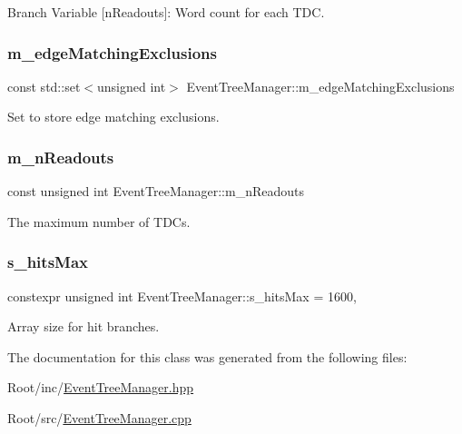 Branch Variable \mbox{[}n\+Readouts\mbox{]}\+: Word count for each T\+DC. 

\mbox{\label{class_event_tree_manager_aea70f1feef081fb124517ba8efc4087b}} 
\subsubsection{\texorpdfstring{m\+\_\+edge\+Matching\+Exclusions}{m\_edgeMatchingExclusions}}
{\footnotesize\ttfamily const std\+::set$<$unsigned int$>$ Event\+Tree\+Manager\+::m\+\_\+edge\+Matching\+Exclusions\hspace{0.3cm}{\ttfamily [private]}}



Set to store edge matching exclusions. 

\mbox{\label{class_event_tree_manager_ac0fce7275ef1c587302ff67e53ad5a77}} 
\subsubsection{\texorpdfstring{m\+\_\+n\+Readouts}{m\_nReadouts}}
{\footnotesize\ttfamily const unsigned int Event\+Tree\+Manager\+::m\+\_\+n\+Readouts\hspace{0.3cm}{\ttfamily [private]}}



The maximum number of T\+D\+Cs. 

\mbox{\label{class_event_tree_manager_aab35ad52374d52149bde894c8af7a8c5}} 
\subsubsection{\texorpdfstring{s\+\_\+hits\+Max}{s\_hitsMax}}
{\footnotesize\ttfamily constexpr unsigned int Event\+Tree\+Manager\+::s\+\_\+hits\+Max = 1600\hspace{0.3cm}{\ttfamily [static]}, {\ttfamily [private]}}



Array size for hit branches. 



The documentation for this class was generated from the following files\+:\begin{DoxyCompactItemize}
\item 
Root/inc/\hyperlink{_event_tree_manager_8hpp}{Event\+Tree\+Manager.\+hpp}\item 
Root/src/\hyperlink{_event_tree_manager_8cpp}{Event\+Tree\+Manager.\+cpp}\end{DoxyCompactItemize}
